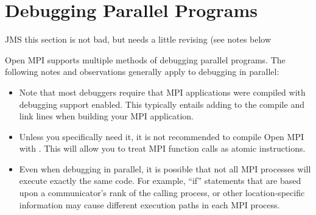 %
% 
% 
%

\chapter{Debugging Parallel Programs}
\label{sec:debug}
\label{sec:debugging}

{\Huge JMS this section is not bad, but needs a little revising (see
  notes below}

Open MPI supports multiple methods of debugging parallel programs.
The following notes and observations generally apply to debugging in
parallel:

\begin{itemize}
\item Note that most debuggers require that MPI applications were
  compiled with debugging support enabled.  This typically entails
  adding  to the compile and link lines when building
  your MPI application.
  
\item Unless you specifically need it, it is not recommended to
  compile Open MPI with .  This will allow you to treat MPI
  function calls as atomic instructions.
  
\item Even when debugging in parallel, it is possible that not all MPI
  processes will execute exactly the same code.  For example, ``if''
  statements that are based upon a communicator's rank of the calling
  process, or other location-specific information may cause different
  execution paths in each MPI process.
\end{itemize}




